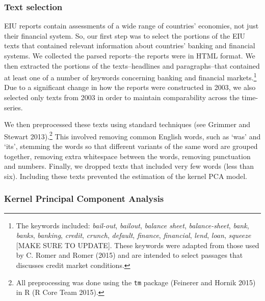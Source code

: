 \documentclass[]{article}
\let\rmarkdownfootnote\footnote%
\def\footnote{\protect\rmarkdownfootnote}
\begin{document}
\subsubsection{Text selection}\label{text-selection}

EIU reports contain assessments of a wide range of countries' economies,
not just their financial system. So, our first step was to select the
portions of the EIU texts that contained relevant information about
countries' banking and financial systems. We collected the parsed
reports--the reports were in HTML format. We then extracted the portions
of the texts--headlines and paragraphs--that contained at least one of a
number of keywords concerning banking and financial markets.\footnote{The
  keywords included: \emph{bail-out}, \emph{bailout}, \emph{balance
  sheet}, \emph{balance-sheet}, \emph{bank}, \emph{banks},
  \emph{banking}, \emph{credit}, \emph{crunch}, \emph{default},
  \emph{finance}, \emph{financial}, \emph{lend}, \emph{loan},
  \emph{squeeze} {[}MAKE SURE TO UPDATE{]}. These keywords were adapted
  from those used by C. Romer and Romer (2015) and are intended to
  select passages that discusses credit market conditions.} Due to a
significant change in how the reports were constructed in 2003, we also
selected only texts from 2003 in order to maintain comparability across
the time-series.

We then preprocessed these texts using standard techniques (see Grimmer
and Stewart 2013).\footnote{All preprocessing was done using the
  \texttt{tm} package (Feinerer and Hornik 2015) in R (R Core Team
  2015).} This involved removing common English words, such as `was' and
`its', stemming the words so that different variants of the same word
are grouped together, removing extra whitespace between the words,
removing punctuation and numbers. Finally, we dropped texts that
included very few words (less than six). Including these texts prevented
the estimation of the kernel PCA model.

\subsubsection{Kernel Principal Component
Analysis}\label{kernel-principal-component-analysis}
\end{document}
